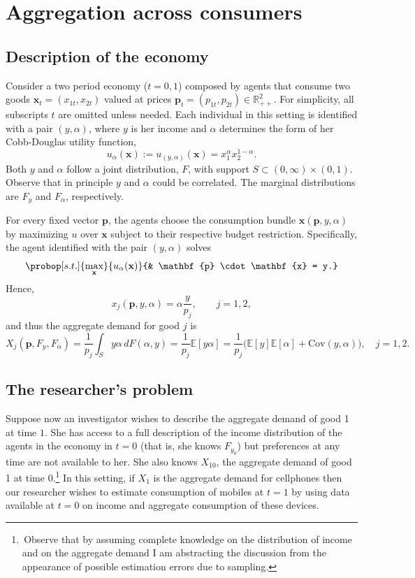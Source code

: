 \documentclass[english, a4paper, 12pt]{article}
\begin{document}
\section{Aggregation across consumers} \label{sec:RepAg}


\subsection{Description of the economy} \label{ssec:RepAgDescr}
Consider a two period economy ($t = 0,1$) composed by agents that consume two goods $\mathbf{x}_{t} = (x_{1t}, x_{2t})$ valued at prices $\mathbf{p}_{t} = (p_{1t}, p_{2t}) \in \mathbb{R}^{2}_{++}$. For simplicity, all subscripts $t$ are omitted unless needed. Each individual in this setting is identified with a pair $(y,\alpha)$, where $y$ is her income and $\alpha$ determines the form of her Cobb-Douglas utility function,
	$$u_{\alpha}(\mathbf{x}) := u_{(y,\alpha)}(\mathbf{x}) = x_{1}^{\alpha}x_{2}^{1-\alpha}.$$
Both $y$ and $\alpha$ follow a joint distribution, $F$, with support $S \subset (0,\infty) \times (0,1)$. Observe that in principle $y$ and $\alpha$ could be correlated. The marginal distributions are $F_{y}$ and $F_{\alpha}$, respectively. 

For every fixed vector $\mathbf{p}$, the agents choose the consumption bundle $\mathbf{x}(\mathbf{p}, y, \alpha)$ by maximizing $u$ over $\mathbf{x}$ subject to their respective budget restriction. Specifically, the agent identified with the pair $(y,\alpha)$ solves
	$$\probop[s.t.]{\max_{\mathbf{x}}}{u_{\alpha}(\mathbf{x})}
							{&	\mathbf{p} \cdot \mathbf{x} = y.}$$ 
Hence,
	$$x_{j}(\mathbf{p}, y, \alpha) = \alpha \frac{y}{p_{j}}, \qquad j = 1,2,$$
and thus the aggregate demand for good $j$ is
	$$X_{j}(\mathbf{p}, F_{y}, F_{\alpha})
		= \frac{1}{p_{j}} \int_{S} y\alpha \,dF(\alpha,y)
		= \frac{1}{p_{j}}\mathbb{E}[y\alpha]
		= \frac{1}{p_{j}}\Big(\mathbb{E}[y]\mathbb{E}[\alpha] + \mathrm{Cov}(y,\alpha)\Big), \quad j = 1,2.
	$$

\subsection{The researcher's problem} \label{ssec:RepAgProblem}
Suppose now an investigator wishes to describe the aggregate demand of good 1 at time $1$. She has access to a full description of the income distribution of the agents in the economy in $t = 0$ (that is, she knows $F_{y_{0}}$) but preferences at any time are not available to her. She also knows $X_{10}$, the aggregate demand of good 1 at time $0$.\footnote{\,Observe that by assuming complete knowledge on the distribution of income and on the aggregate demand I am abstracting the discussion from the appearance of possible estimation errors due to sampling.} In this setting, if $X_{1}$ is the aggregate demand for cellphones then our researcher wishes to estimate consumption of mobiles at $t=1$ by using data available at $t=0$ on income and aggregate consumption of these devices.
\end{document}
